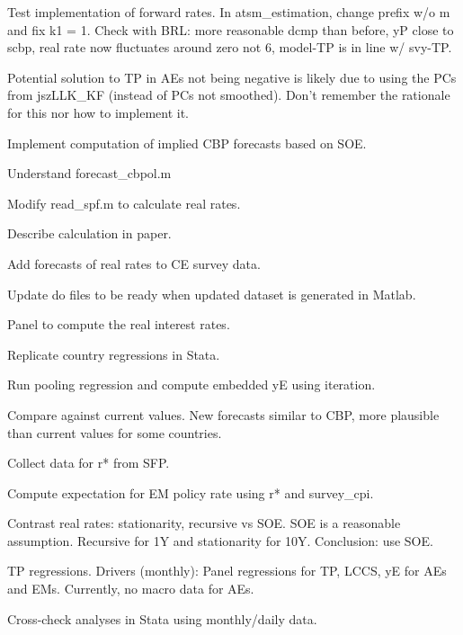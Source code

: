 \documentclass[12pt]{article}
\newcommand{\cmark}{\ding{51}}
\newcommand{\xmark}{\ding{55}}
\newcommand{\done}{\rlap{$\square$}{\raisebox{2pt}{\large\hspace{1pt}\cmark}}%
	\hspace{-2.5pt}}
\newcommand{\wontdo}{\rlap{$\square$}{\large\hspace{1pt}\xmark}}
\begin{document}
\begin{todolist}
\begin{todolist}
		\item[\done] Test implementation of forward rates. In atsm_estimation, change prefix w/o m and fix k1 = 1. Check with BRL: more reasonable dcmp than before, yP close to scbp, real rate now fluctuates around zero not 6, model-TP is in line w/ svy-TP.
		\item[\wontdo] Potential solution to TP in AEs not being negative is likely due to using the PCs from jszLLK_KF (instead of PCs not smoothed). Don't remember the rationale for this nor how to implement it.
	\end{todolist}
	\item[\done] Implement computation of implied CBP forecasts based on SOE.
	\begin{todolist}
		\item[\done] Understand forecast_cbpol.m
		\item[\done] Modify read_spf.m to calculate real rates.
		\item[\done] Describe calculation in paper.
		\item[\done] Add forecasts of real rates to CE survey data.
	\end{todolist}
	\item[\done] Update do files to be ready when updated dataset is generated in Matlab.
	\item[\done] Panel to compute the real interest rates.
	\begin{todolist}
		\item[\done] Replicate country regressions in Stata.
		\item[\done] Run pooling regression and compute embedded yE using iteration. 
		\item[\done] Compare against current values. New forecasts similar to CBP, more plausible than current values for some countries.
		\item[\done] Collect data for r* from SFP.
		\item[\done] Compute expectation for EM policy rate using r* and survey_cpi.
		\item[\done] Contrast real rates: stationarity, recursive vs SOE. SOE is a reasonable assumption. Recursive for 1Y and stationarity for 10Y. Conclusion: use SOE.
	\end{todolist}
	\item[\done] TP regressions. Drivers (monthly): Panel regressions for TP, LCCS, yE for AEs and EMs. Currently, no macro data for AEs.
	\item[\done] Cross-check analyses in Stata using monthly/daily data.

\end{todolist}
\end{document}
